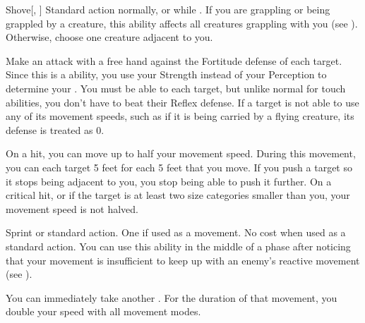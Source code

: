         \begin{activeability}{Shove}[, ]
            \label{Shove}
            \abilityusagetime Standard action normally, or  while \grappling.
            \rankline
            If you are grappling or being grappled by a creature, this ability affects all creatures grappling with you (see ).
            Otherwise, choose one creature adjacent to you.

            Make an attack with a free hand against the Fortitude defense of each target.
            Since this is a  ability, you use your Strength instead of your Perception to determine your .
            You must be able to  each target, but unlike normal for touch abilities, you don't have to beat their Reflex defense.
            If a target is not able to use any of its movement speeds, such as if it is being carried by a flying creature, its defense is treated as 0.

            On a hit, you can move up to half your movement speed.
            During this movement, you can  each target 5 feet for each 5 feet that you move.
            If you push a target so it stops being adjacent to you, you stop being able to push it further.
            On a critical hit, or if the target is at least two size categories smaller than you, your movement speed is not halved.
        \end{activeability}

        \begin{activeability}{Sprint}
            \label{Sprint}
            \abilityusagetime {} or standard action.
            \abilitycost One  if used as a movement. No cost when used as a standard action.
            \rankline
            You can use this ability in the middle of a phase after noticing that your movement is insufficient to keep up with an enemy's reactive movement (see ).

            You can immediately take another .
            For the duration of that movement, you double your speed with all movement modes.
        \end{activeability}

